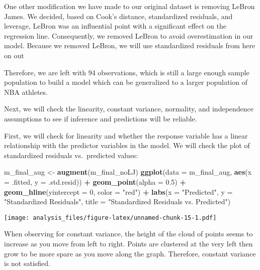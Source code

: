 \documentclass[]{article}
\newenvironment{Shaded}{\begin{snugshade}}{\end{snugshade}}
\newcommand{\DataTypeTok}[1]{\textcolor[rgb]{0.13,0.29,0.53}{#1}}
\newcommand{\DecValTok}[1]{\textcolor[rgb]{0.00,0.00,0.81}{#1}}
\newcommand{\FloatTok}[1]{\textcolor[rgb]{0.00,0.00,0.81}{#1}}
\newcommand{\KeywordTok}[1]{\textcolor[rgb]{0.13,0.29,0.53}{\textbf{#1}}}
\newcommand{\NormalTok}[1]{#1}
\newcommand{\OperatorTok}[1]{\textcolor[rgb]{0.81,0.36,0.00}{\textbf{#1}}}
\newcommand{\StringTok}[1]{\textcolor[rgb]{0.31,0.60,0.02}{#1}}
\begin{document}
One other modification we have made to our original dataset is removing
LeBron James. We decided, based on Cook's distance, standardized
residuals, and leverage, LeBron was an influential point with a
significant effect on the regression line. Consequently, we removed
LeBron to avoid overestimation in our model. Because we removed LeBron,
we will use standardized residuals from here on out

Therefore, we are left with 94 observations, which is still a large
enough sample population to build a model which can be generalized to a
larger population of NBA athletes.

Next, we will check the linearity, constant variance, normality, and
independence assumptions to see if inference and predictions will be
reliable.

First, we will check for linearity and whether the response variable has
a linear relationship with the predictor variables in the model. We will
check the plot of standardized residuals vs.~predicted values:

\begin{Shaded}
\begin{Highlighting}[]
\NormalTok{m_final_aug <-}\StringTok{ }\KeywordTok{augment}\NormalTok{(m_final_noLJ)}
\KeywordTok{ggplot}\NormalTok{(}\DataTypeTok{data =}\NormalTok{ m_final_aug, }\KeywordTok{aes}\NormalTok{(}\DataTypeTok{x =}\NormalTok{ .fitted, }\DataTypeTok{y =}\NormalTok{ .std.resid)) }\OperatorTok{+}
\StringTok{  }\KeywordTok{geom_point}\NormalTok{(}\DataTypeTok{alpha =} \FloatTok{0.5}\NormalTok{) }\OperatorTok{+}\StringTok{ }
\StringTok{  }\KeywordTok{geom_hline}\NormalTok{(}\DataTypeTok{yintercept =} \DecValTok{0}\NormalTok{, }\DataTypeTok{color =} \StringTok{"red"}\NormalTok{) }\OperatorTok{+}
\StringTok{  }\KeywordTok{labs}\NormalTok{(}\DataTypeTok{x =} \StringTok{"Predicted"}\NormalTok{, }\DataTypeTok{y =} \StringTok{"Standardized Residuals"}\NormalTok{, }
       \DataTypeTok{title =} \StringTok{"Standardized Residuals vs. Predicted"}\NormalTok{)}
\end{Highlighting}
\end{Shaded}

\texttt{[image: analysis\_files/figure-latex/unnamed-chunk-15-1.pdf]}

When observing for constant variance, the height of the cloud of points
seems to increase as you move from left to right. Points are clustered
at the very left then grow to be more spare as you move along the graph.
Therefore, constant variance is not satisfied.
\end{document}
